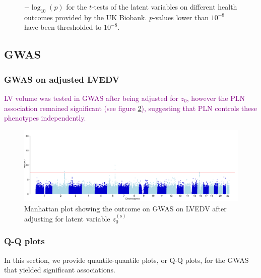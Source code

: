 \begin{figure}
\caption{$-\log_{10}(p)$ for the $t$-tests of the latent variables on different health outcomes provided by the UK Biobank. $p$-values lower than $10^{-8}$ have been thresholded to $10^{-8}$.}
\label{fig:health_outcomes}
\end{figure}

\subsection{GWAS}

\subsubsection{GWAS on adjusted LVEDV}
\textcolor{purple}{LV volume was tested in GWAS after being adjusted for $z_0$, however the PLN association remained significant (see figure \ref{fig:LVEDV_adj_by_z5}), suggesting that PLN controls these phenotypes independently.}

\begin{figure}[ht!]
\includegraphics[width=\textwidth]{figs/supplementary/GWAS__LVEDV__std_covariates_adj_by_z5__GBR_ALL__qc__manhattan}
\caption{Manhattan plot showing the outcome on GWAS on LVEDV after adjusting for latent variable $z_0^{(\text{s})}$}
\label{fig:LVEDV_adj_by_z5}
\end{figure}


\subsubsection{Q-Q plots}
In this section, we provide quantile-quantile plots, or Q-Q plots, for the GWAS that yielded significant associations. %


